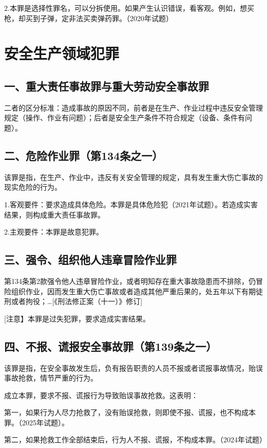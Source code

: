 2.本罪是选择性罪名，可以分拆使用。如果产生认识错误，看客观。例如，想买枪，却买到子弹，定非法买卖弹药罪。（2020年试题）

\section{安全生产领域犯罪}

\subsection*{一、重大责任事故罪与重大劳动安全事故罪}

二者的区分标准：造成事故的原因不同，前者是在生产、作业过程中违反安全管理规定（操作、作业有问题）；后者是安全生产条件不符合规定（设备、条件有问题）。

\subsection*{二、危险作业罪（第134条之一）}

该罪是指，在生产、作业中，违反有关安全管理的规定，具有发生重大伤亡事故的现实危险的行为。

1.客观要件：要求造成具体危险。本罪是具体危险犯（2021年试题）。若造成实害结果，则构成重大责任事故罪。

2.主观要件：本罪是故意犯罪。


\subsection*{三、强令、组织他人违章冒险作业罪}

第134条第2款强令他人违章冒险作业，或者明知存在重大事故隐患而不排除，仍冒险组织作业，因而发生重大伤亡事故或者造成其他严重后果的，处五年以下有期徒刑或者拘役；…[《刑法修正案（十一）》修订]

[注意】本罪是过失犯罪，要求造成实害结果。

\subsection*{四、不报、谎报安全事故罪（第139条之一）}

该罪是指，在安全事故发生后，负有报告职责的人员不报或者谎报事故情况，贻误事故抢救，情节严重的行为。

成立本罪，要求不报、谎报行为导致贻误事故抢救。这表明：

第一，如果行为人尽力抢救了，没有贻误抢救，则即使不报、谎报，也不构成本罪。（2025年试题）。

第二，如果抢救工作全部结束后，行为人不报、谎报，不构成本罪。（2024年试题）
